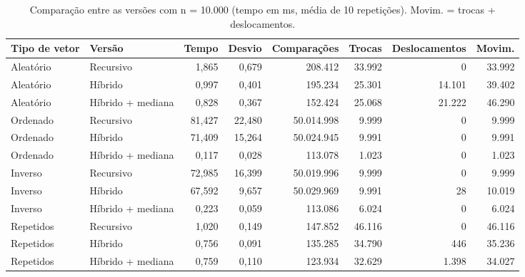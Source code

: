 \begin{table}[htbp]
  \centering
  \small
  \setlength{\tabcolsep}{4pt}
  \caption{Comparação entre as versões com n = 10.000 (tempo em ms, média de 10 repetições). Movim. = trocas + deslocamentos.}
  \label{tab:comparacao-n10000}
  \begin{tabular}{llrrrrrr}
    \toprule
    Tipo de vetor & Versão & Tempo & Desvio & Comparações & Trocas & Deslocamentos & Movim. \\
    \midrule
    Aleatório & Recursivo & 1,865 & 0,679 & 208.412 & 33.992 & 0 & 33.992 \\
    Aleatório & Híbrido & 0,997 & 0,401 & 195.234 & 25.301 & 14.101 & 39.402 \\
    Aleatório & Híbrido + mediana & 0,828 & 0,367 & 152.424 & 25.068 & 21.222 & 46.290 \\
    Ordenado & Recursivo & 81,427 & 22,480 & 50.014.998 & 9.999 & 0 & 9.999 \\
    Ordenado & Híbrido & 71,409 & 15,264 & 50.024.945 & 9.991 & 0 & 9.991 \\
    Ordenado & Híbrido + mediana & 0,117 & 0,028 & 113.078 & 1.023 & 0 & 1.023 \\
    Inverso & Recursivo & 72,985 & 16,399 & 50.019.996 & 9.999 & 0 & 9.999 \\
    Inverso & Híbrido & 67,592 & 9,657 & 50.029.969 & 9.991 & 28 & 10.019 \\
    Inverso & Híbrido + mediana & 0,223 & 0,059 & 113.086 & 6.024 & 0 & 6.024 \\
    Repetidos & Recursivo & 1,020 & 0,149 & 147.852 & 46.116 & 0 & 46.116 \\
    Repetidos & Híbrido & 0,756 & 0,091 & 135.285 & 34.790 & 446 & 35.236 \\
    Repetidos & Híbrido + mediana & 0,759 & 0,110 & 123.934 & 32.629 & 1.398 & 34.027 \\
    \bottomrule
  \end{tabular}
\end{table}

